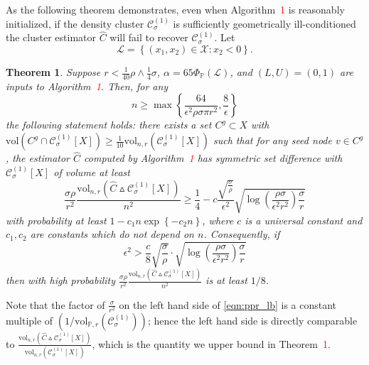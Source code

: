 \documentclass[11pt,twoside]{article}
\newtheorem{theorem}{Theorem}
\newcommand{\set}[1]{\left\{#1\right\}}
\newcommand{\vol}{\mathrm{vol}}
\newcommand{\1}{\mathbf{1}}
\newcommand{\Xbf}{X}             %
\newcommand{\Pbb}{\mathbb{P}}
\newcommand{\Cset}{\mathcal{C}}
\newcommand{\Csig}{\Cset_{\sigma}}
\begin{document}
As the following theorem demonstrates, even when Algorithm~\textcolor{red}{1} is reasonably initialized, if the density cluster $\mathcal{C}_{\sigma}^{(1)}$ is sufficiently geometrically ill-conditioned the cluster estimator $\widehat{C}$ will fail to recover $\mathcal{C}_{\sigma}^{(1)}$. Let
\begin{equation}
\label{eqn:lower_set}
\mathcal{L} = \set{(x_1,x_2) \in \mathcal{X}: x_2 < 0}.
\end{equation}
\begin{theorem}
	\label{thm:ppr_lb}
	Suppose $r < \frac{1}{40}\rho \wedge \frac{1}{4}\sigma$,  $\alpha = 65 \Phi_{\Pbb}(\mathcal{L})$, and $(L,U) = (0,1)$ are inputs to Algorithm~\textcolor{red}{1}. Then, for any
	\begin{equation}
	\label{eqn:lb_sample_size}
	n \geq \max\set{\frac{64}{\epsilon^2 \rho \sigma \pi r^2}, \frac{8}{\epsilon}}
	\end{equation}
	the following statement holds: there exists a set $C^{g} \subset \Xbf$ with $\vol(C^g \cap \mathcal{C}_{\sigma}^{(1)}[\Xbf]) \geq \frac{1}{10}\vol_{n,r}(\mathcal{C}_{\sigma}^{(1)}[\Xbf])$ such that for any seed node $v \in C^g$, the estimator $\widehat{C}$ computed by Algorithm~\textcolor{red}{1} has symmetric set difference with $\Csig^{(1)}[\Xbf]$ of volume at least
	\begin{equation}
	\label{eqn:ppr_lb}
	\frac{\sigma \rho}{r^2}\frac{\vol_{n,r}(\widehat{C} \vartriangle \mathcal{C}_{\sigma}^{(1)}[\Xbf])}{n^2} \geq \frac{1}{4} -  c \frac{\sqrt{\frac{\sigma}{\rho}}}{\epsilon^2} \sqrt{ \log\left(\frac{\rho \sigma}{\epsilon^2 r^2}\right)\frac{\sigma}{r}}
	\end{equation}
	with probability at least $1 - c_1 n \exp\set{-c_2n}$, where $c$ is a universal constant and $c_1,c_2$ are constants which do not depend on $n$.
	Consequently, if
	\begin{equation*} 
	\epsilon^2 > \frac{c}{8} \sqrt{\frac{\sigma}{\rho}} \cdot \sqrt{ \log\left(\frac{\rho \sigma}{\epsilon^2 r^2}\right)\frac{\sigma}{r}}
	\end{equation*}
	then with high probability $\frac{\sigma \rho}{r^2}\frac{\vol_{n,r}(\widehat{C} \vartriangle \mathcal{C}_{\sigma}^{(1)}[\Xbf])}{n^2}$ is at least $1/8$. 
\end{theorem}

Note that the factor of $\frac{\sigma}{r^2}$ on the left hand side of \eqref{eqn:ppr_lb} is a constant multiple of $(1/\vol_{\Pbb,r}(\Csig^{(1)}))$; hence the left hand side is directly comparable to $\frac{\vol_{n,r}(\widehat{C} \vartriangle \mathcal{C}_{\sigma}^{(1)}[\Xbf])}{\vol_{n,r}(\Csig^{(1)}[\Xbf])}$, which is the quantity we upper bound in Theorem~\textcolor{red}{1}.
\end{document}
